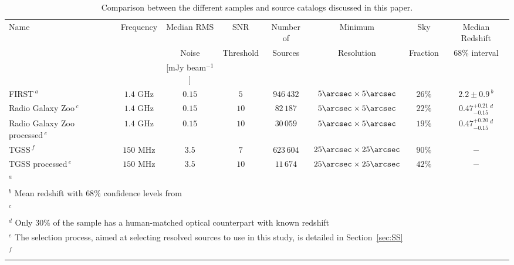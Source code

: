 \begin{table*}
\caption{Comparison between the different samples and source catalogs discussed in this paper.}
\label{tab:surveys}
\begin{tabular}{lccccccc}
\hline
Name & Frequency & Median RMS & SNR & Number of & Minimum & Sky & Median Redshift \\
     &           & Noise      & Threshold  & Sources   &  Resolution & Fraction & $68\%$ interval \\
     &           &[mJy beam$^{-1}$] &       &           &            &          &                  \\ 

\hline
				FIRST\,$^a$ &
				$1.4$ GHz & 
				$0.15$& 
				$5$&
				$946\,432$& 
				$5\arcsec\times5\arcsec$& 
				$26\%$&
				$2.2\pm0.9$\,$^b$ 
				\\ 
				Radio Galaxy Zoo\,$^c$  & 
				$1.4$ GHz & 
				$0.15$ & 
				$10$& 
				$82\,187$&  
				$5\arcsec\times5\arcsec$& 
				$22\%$& 
				$0.47_{-0.15}^{+0.21}$\,$^d$ 
				\\
				Radio Galaxy Zoo processed\,$^e$ & 
				$1.4$ GHz &  
				$0.15$& 
				$10$& 
				$30\,059$  &
				$5\arcsec\times5\arcsec$& 
				$19\%$& 
				$0.47_{-0.15}^{+0.20}$\,$^d$ 
				\\
				TGSS\,$^f$& 
				$150$ MHz & 
				$3.5$& 
				$7$& 
				$623\,604$ & 
				$25\arcsec\times25\arcsec$& 
				$90\%$& 
				$-$
				\\
				TGSS processed\,$^e$ & 
				$150$ MHz & 
				$3.5$& 
				$10$& 
				$11\,674$ & 
				$25\arcsec\times25\arcsec$& 
				$42\%$& 
				$-$ \\
\hline
\multicolumn{8}{l}{ $^a$ \cite{Helfand2015b}} \\
\multicolumn{8}{l}{ $^b$ Mean redshift with $68\%$ confidence levels from \cite{Chang2004}}	\\
\multicolumn{8}{l}{ $^c$ \cite{Banfield2015}} \\
\multicolumn{8}{l}{ $^d$ Only $30\%$ of the sample has a human-matched optical counterpart with known redshift} \\
\multicolumn{8}{l}{ $^e$ The selection process, aimed at selecting resolved sources to use in this study, is detailed in Section~\ref{sec:SS}} \\
\multicolumn{8}{l}{ $^f$ \cite{Intema2016}} \\
\end{tabular}
\end{table*}